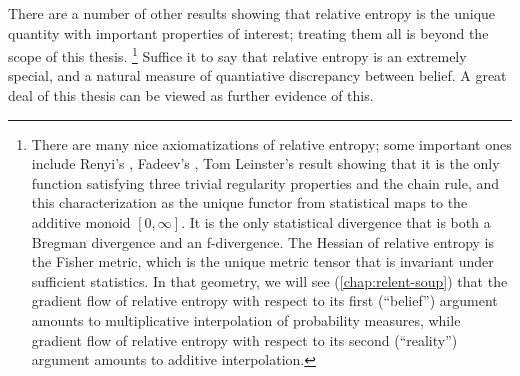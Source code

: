 There are a number of other results showing that relative entropy is the unique quantity with important properties of interest; treating them all is beyond the scope of this thesis.%
\footnote{%
There are many nice axiomatizations of relative entropy;
some important ones include Renyi's \cite{renyi1961measures}, Fadeev's \cite{fadeev1957begriff}, Tom Leinster's result showing
that it is the only function satisfying three trivial regularity
properties and the chain rule, and this characterization as the unique
functor from statistical maps to the additive monoid $[0,\infty]$.  It is the
only statistical divergence that is both a Bregman divergence and an
f-divergence.  The Hessian of relative entropy is the Fisher metric, 
which is the unique metric tensor that is invariant under sufficient statistics. 
In that geometry, we will see (\cref{chap:relent-soup}) that the gradient flow of relative entropy
with respect to its first (``belief'') argument amounts to
multiplicative interpolation of probability measures, while gradient
flow of relative entropy with respect to its second (``reality'')
argument amounts to additive interpolation. 
}
%
Suffice it to say that relative entropy is an extremely special,
    and a natural measure of quantiative discrepancy between belief. 
A great deal of this thesis can be viewed as further evidence of this. 
    
%




